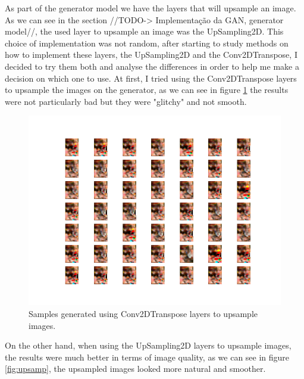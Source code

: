 \documentclass[12pt,a4paper,oneside]{memoir}
\begin{document}
As part of the generator model we have the layers that will upsample an image. As we can see in the section //TODO-> Implementação da GAN, generator model//, the used layer to upsample an image was the UpSampling2D. This choice of implementation was not random, after starting to study methods on how to implement these layers, the UpSampling2D and the Conv2DTranspose, I decided to try them both and analyse the differences in order to help me make a decision on which one to use. At first, I tried using the Conv2DTranspose layers to upsample the images on the generator, as we can see in figure \ref{fig:conv} the results were not particularly bad but they were "glitchy" and not smooth.  



\begin{figure}[H]
\centering
\includegraphics[width=1\textwidth]{images/conv.png}
\caption{Samples generated using Conv2DTranspose layers to upsample images.}
\centering
\label{fig:conv}
\end{figure}


On the other hand, when using the UpSampling2D layers to upsample images, the results were much better in terms of image quality, as we can see in figure \ref{fig:upsamp}, the upsampled images looked more natural and smoother.
\end{document}
